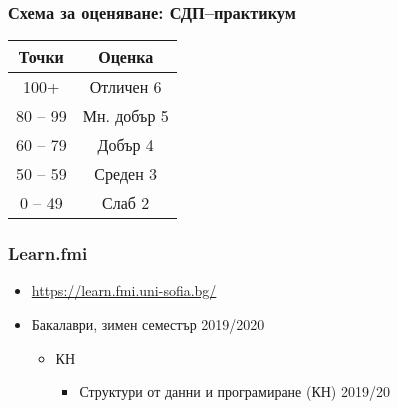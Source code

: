 \documentclass{beamer}
\begin{document}
\begin{frame}
  \frametitle{Схема за оценяване: СДП--практикум}

  \begin{center}
    \begin{tabular}{|c|c|}
      \hline
      \textbf{Точки} & \textbf{Оценка}\\
      \hline\hline
      100+&Отличен 6\\
      \hline
      80 -- 99&Мн. добър 5\\
      \hline
      60 -- 79&Добър 4\\
      \hline
      50  -- 59&Среден 3\\
      \hline
      0  --  49&Слаб 2\\
      \hline
    \end{tabular}
  \end{center}
\end{frame}

\begin{frame}
  \frametitle{Learn.fmi}

  \begin{itemize}
  \item \url{https://learn.fmi.uni-sofia.bg/}
  \item Бакалаври, зимен семестър 2019/2020
    \begin{itemize}
    \item КН
      \begin{itemize}
      \item Структури от данни и програмиране (КН) 2019/20
      \end{itemize}
    \end{itemize}
  \end{itemize}
\end{frame}
\end{document}
